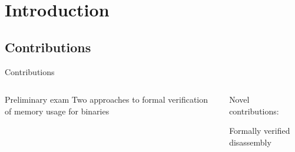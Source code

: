 \section{Introduction}

\subsection{Contributions}

\begin{frame}[label=contribs]{Contributions}
  \begin{columns}[t]
    \begin{block}{Preliminary exam}
      Two approaches to \alert<1>{formal verification of memory usage for binaries}

      \hyperlink{floyd}{}
      \hyperlink{hoare}{}
    \end{block}

    \pause

    \begin{alertblock}{Novel contributions: }
      \begin{outline}
        \pause
        \1 Formally verified disassembly
        \pause
        \1  %
      \end{outline}
    \end{alertblock}
  \end{columns}
\end{frame}

